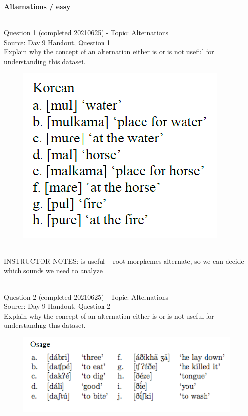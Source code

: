 \documentclass[12pt]{article}
\begin{document}
\newpage\textbf{\underline{\huge Alternations / easy\\}}

~\\

{\large Question 1} (completed 20210625) - Topic: Alternations\\
Source: Day 9 Handout, Question 1\\

Explain why the concept of an alternation either is or is not useful for understanding this dataset.\\

\begin{figure}[H]
\includegraphics{../images/korean.png}
\end{figure}

~\\
INSTRUCTOR NOTES: is useful -- root morphemes alternate, so we can decide which sounds we need to analyze


~\\

{\large Question 2} (completed 20210625) - Topic: Alternations\\
Source: Day 9 Handout, Question 2\\

Explain why the concept of an alternation either is or is not useful for understanding this dataset.\\

\begin{figure}[H]
\includegraphics{../images/osage.png}
\end{figure}
\end{document}
